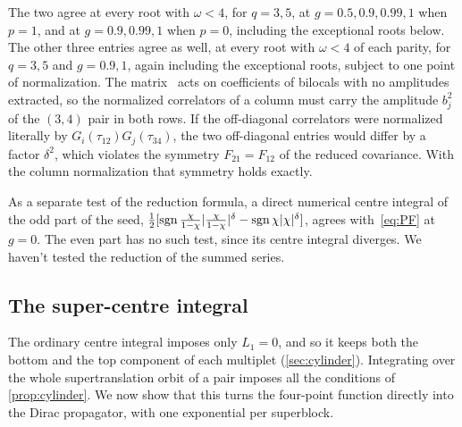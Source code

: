 The two agree at every root with $\omega<4$, for $q=3,5$, at $g=0.5,0.9,0.99,1$ when $p=1$, and at $g=0.9,0.99,1$ when $p=0$, including the exceptional roots below. The other three entries agree as well, at every root with $\omega<4$ of each parity, for $q=3,5$ and $g=0.9,1$, again including the exceptional roots, subject to one point of normalization. The matrix~\cite[(4.25)]{Peng:2017spg} acts on coefficients of bilocals with no amplitudes extracted, so the normalized correlators of a column must carry the amplitude $b_j^2$ of the $(3,4)$ pair in both rows. If the off-diagonal correlators were normalized literally by $G_i(\tau_{12})G_j(\tau_{34})$, the two off-diagonal entries would differ by a factor $\delta^2$, which violates the symmetry $F_{21}=F_{12}$ of the reduced covariance. With the column normalization that symmetry holds exactly.

As a separate test of the reduction formula, a direct numerical centre integral of the odd part of the seed, $\frac12[\operatorname{sgn}\frac{\chi}{1-\chi}|\frac{\chi}{1-\chi}|^\delta-\operatorname{sgn}\chi|\chi|^\delta]$, agrees with~\eqref{eq:PF} at $g=0$. The even part has no such test, since its centre integral diverges. We haven't tested the reduction of the summed series.

\subsection{The super-centre integral}
\label{subsec:supercentre}

The ordinary centre integral imposes only $L_1=0$, and so it keeps both the bottom and the top component of each multiplet (\cref{sec:cylinder}). Integrating over the whole supertranslation orbit of a pair imposes all the conditions of \cref{prop:cylinder}. We now show that this turns the four-point function directly into the Dirac propagator, with one exponential per superblock.


